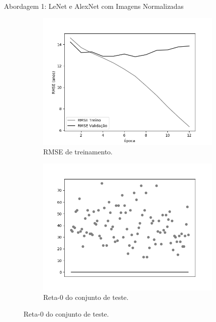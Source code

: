 \begin{frame}{Abordagem 1: LeNet e AlexNet com Imagens Normalizadas}
  \begin{figure}[h!]
    \caption{Resultados do treinamento e teste da CNN LeNet \emph{Leaky ReLU}.}
  \begin{subfigure}[hb]{0.4\textwidth}
    \caption{RMSE de treinamento.}
    \includegraphics[width=\linewidth]{img/graficos/history/lenet/fig-history-image-treat-1-lenet-lrelu-rmse.png}
  \end{subfigure}
  \begin{subfigure}[hb]{0.4\textwidth}
    \caption{Reta-0 do conjunto de teste.}
   \includegraphics[width=\linewidth]{img/graficos/reta0/lenet/fig-reta-0-image-treat-1-lenet-lrelu.png}
  \end{subfigure}%
\end{figure}
\end{frame}

